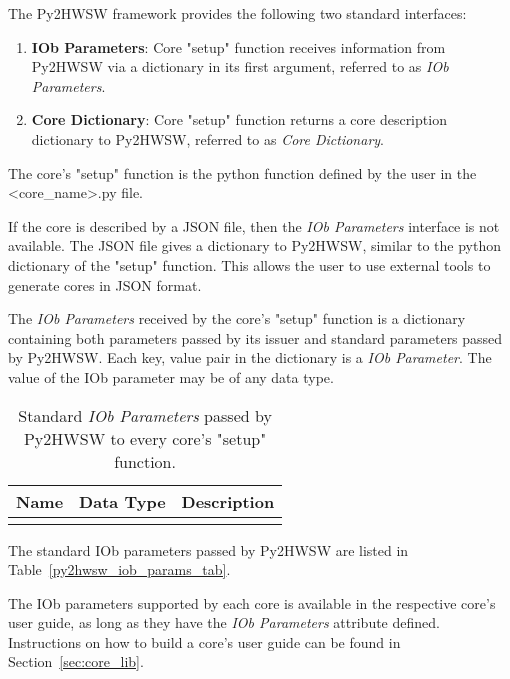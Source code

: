 %

The Py2HWSW framework provides the following two standard interfaces:
\begin{enumerate}
  \item \textbf{IOb Parameters}: Core "setup" function receives information from Py2HWSW via a dictionary in its first argument, referred to as \textit{IOb Parameters}.
  \item \textbf{Core Dictionary}: Core "setup" function returns a core description dictionary to Py2HWSW, referred to as \textit{Core Dictionary}.
\end{enumerate}

The core's "setup" function is the python function defined by the user in the <core\_name>.py file.

If the core is described by a JSON file, then the \textit{IOb Parameters} interface is not available.
The JSON file gives a dictionary to Py2HWSW, similar to the python dictionary of the "setup" function.
This allows the user to use external tools to generate cores in JSON format.

%
%

The \textit{IOb Parameters} received by the core's "setup" function is a dictionary containing both parameters passed by its issuer and standard parameters passed by Py2HWSW.
Each key, value pair in the dictionary is a \textit{IOb Parameter}.
The value of the IOb parameter may be of any data type.

\begin{xltabular}{\textwidth}{|l|l|X|}

  \hline
  {\bf Name} & {\bf Data Type} & {\bf Description}  \\ \hline \hline

  

  \caption{Standard \textit{IOb Parameters} passed by Py2HWSW to every core's "setup" function.}
\end{xltabular}
\label{py2hwsw_iob_params_tab}

The standard IOb parameters passed by Py2HWSW are listed in Table~\ref{py2hwsw_iob_params_tab}.

The IOb parameters supported by each core is available in the respective core's user guide, as long as they have the \textit{IOb Parameters} attribute defined.
Instructions on how to build a core's user guide can be found in Section~\ref{sec:core_lib}. 


